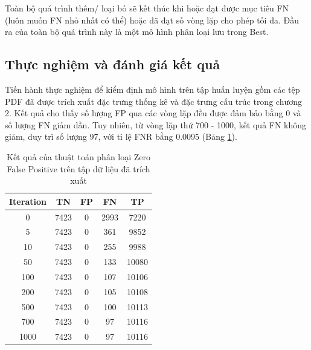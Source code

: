 \documentclass[./../main.tex]{subfiles}
\begin{document}
Toàn bộ quá trình thêm/ loại bỏ sẽ kết thúc khi hoặc đạt được mục tiêu FN (luôn muốn FN nhỏ nhất có thể) hoặc đã đạt số vòng lặp cho phép tối đa. Đầu ra của toàn bộ quá trình này là một mô hình phân loại lưu trong Best.

\subsection{Thực nghiệm và đánh giá kết quả}
Tiến hành thực nghiệm để kiểm định mô hình trên tập huấn luyện gồm các tệp PDF đã được trích xuất đặc trưng thống kê và đặc trưng cấu trúc trong chương 2. Kết quả cho thấy số lượng FP qua các vòng lặp đều được đảm bảo bằng 0 và số lượng FN giảm dần. Tuy nhiên, từ vòng lặp thứ 700 - 1000, kết quả FN không giảm, duy trì số lượng 97, với tỉ lệ FNR bằng 0.0095 (Bảng \ref{tab:ket_qua_thuat_toan_phan_loai}).

\begin{table}[]
	\centering
	\caption{Kết quả của thuật toán phân loại Zero False Positive trên tập dữ liệu đã trích xuất}
	\label{tab:ket_qua_thuat_toan_phan_loai}
	\begin{tabular}{|c|c|c|c|c|}
		\hline
		\textbf{Iteration} & \textbf{TN} & \textbf{FP} & \textbf{FN} & \textbf{TP} \\ \hline
		0                  & 7423        & 0           & 2993        & 7220        \\ \hline
		5                  & 7423        & 0           & 361         & 9852        \\ \hline
		10                 & 7423        & 0           & 255         & 9988        \\ \hline
		50                 & 7423        & 0           & 133         & 10080       \\ \hline
		100                & 7423        & 0           & 107         & 10106       \\ \hline
		200                & 7423        & 0           & 105         & 10108       \\ \hline
		500                & 7423        & 0           & 100         & 10113       \\ \hline
		700                & 7423        & 0           & 97          & 10116       \\ \hline
		1000               & 7423        & 0           & 97          & 10116       \\ \hline
	\end{tabular}
\end{table}
\end{document}

